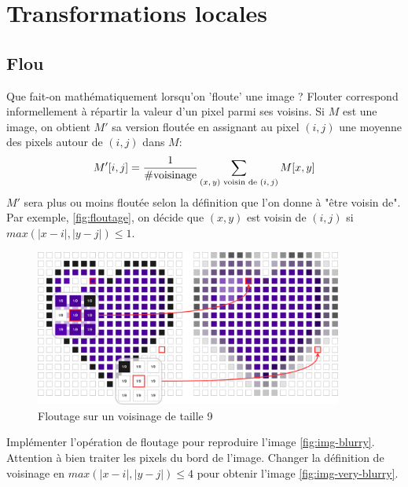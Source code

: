 

\section*{Transformations locales}

\subsection*{Flou}

Que fait-on mathématiquement lorsqu'on 'floute' une image ? Flouter correspond informellement à répartir la valeur d'un pixel parmi ses voisins. Si $ M $ est une image, on obtient $ M' $ sa version floutée en assignant au pixel $ (i,j) $  une moyenne des pixels autour de $ (i,j) $ dans $ M $:\[
    M'[i, j] = \frac{1}{\#\textrm{voisinage}} \sum_{\textrm{$ (x, y) $ voisin de $ (i, j) $}} M[x,y] 
\]
$ M' $ sera plus ou moins floutée selon la définition que l'on donne à "être voisin de". Par exemple, \autoref{fig:floutage}, on décide que $ (x, y) $ est voisin de $ (i,j) $ si $ max(|x-i|, |y-j|) \leq 1 $.

\begin{figure}[h!]
    \begin{center}
        \includegraphics[width=0.9\textwidth]{figures/11/heart-convolution.png}
    \end{center}
    \caption{Floutage sur un voisinage de taille 9}
    \label{fig:floutage}
\end{figure}

\quessques Implémenter l'opération de floutage pour reproduire l'image \autoref{fig:img-blurry}. Attention à bien traiter les pixels du bord de l'image.
\ssques Changer la définition de voisinage en $ max(|x-i|, |y-j|) \leq 4 $ pour obtenir l'image \autoref{fig:img-very-blurry}.

